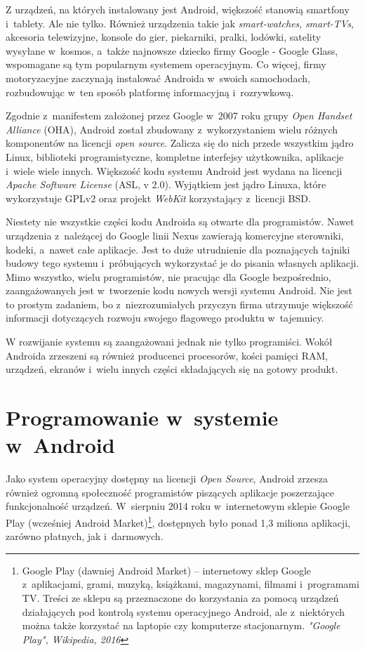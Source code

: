 Z urządzeń, na których instalowany jest Android, większość stanowią smartfony i~tablety. Ale nie tylko. Również urządzenia takie jak \textit{smart-watches}, \textit{smart-TVs}, akcesoria telewizyjne, konsole do gier, piekarniki, pralki, lodówki, satelity wysyłane w~kosmos, a~także najnowsze dziecko firmy Google - Google Glass, wspomagane są tym popularnym systemem operacyjnym. Co więcej, firmy motoryzacyjne zaczynają instalować Androida w~swoich samochodach, rozbudowując w~ten sposób platformę informacyjną i~rozrywkową.

Zgodnie z~manifestem założonej przez Google w~2007 roku grupy \textit{Open Handset Alliance} (OHA), Android został zbudowany z~wykorzystaniem wielu różnych komponentów na licencji \textit{open source}. Zalicza się do nich przede wszystkim jądro Linux, biblioteki programistyczne, kompletne interfejsy użytkownika, aplikacje i~wiele wiele innych. Większość kodu systemu Android jest wydana na licencji \textit{Apache Software License} (ASL, v 2.0). Wyjątkiem jest jądro Linuxa, które wykorzystuje GPLv2 oraz projekt \textit{WebKit} korzystający z~licencji BSD. 

Niestety nie wszystkie części kodu Androida są otwarte dla programistów. Nawet urządzenia z~należącej do Google linii Nexus zawierają komercyjne sterowniki, kodeki, a~nawet całe aplikacje. Jest to duże utrudnienie dla poznających tajniki budowy tego systemu i~próbujących wykorzystać je do pisania własnych aplikacji. Mimo wszystko, wielu programistów, nie pracując dla Google bezpośrednio, zaangażowanych jest w~tworzenie kodu nowych wersji systemu Android. Nie jest to prostym zadaniem, bo z~niezrozumiałych przyczyn firma utrzymuje większość informacji dotyczących rozwoju swojego flagowego produktu w~tajemnicy.

W rozwijanie systemu są zaangażowani jednak nie tylko programiści. Wokół Androida zrzeszeni są również producenci procesorów, kości pamięci RAM, urządzeń, ekranów i~wielu innych części składających się na gotowy produkt.

\section{Programowanie w~systemie w~Android}
Jako system operacyjny dostępny na licencji \textit{Open Source}, Android zrzesza również ogromną społeczność programistów piszących aplikacje poszerzające funkcjonalność urządzeń. W~sierpniu 2014 roku w~internetowym sklepie Google Play (wcześniej Android Market)\footnote{Google Play (dawniej Android Market) – internetowy sklep Google z~aplikacjami, grami, muzyką, książkami, magazynami, filmami i~programami TV. Treści ze sklepu są przeznaczone do korzystania za pomocą urządzeń działających pod kontrolą systemu operacyjnego Android, ale z~niektórych można także korzystać na laptopie czy komputerze stacjonarnym. \textit{"Google Play", Wikipedia, 2016}}, dostępnych było ponad 1,3 miliona aplikacji, zarówno płatnych, jak i~darmowych.

